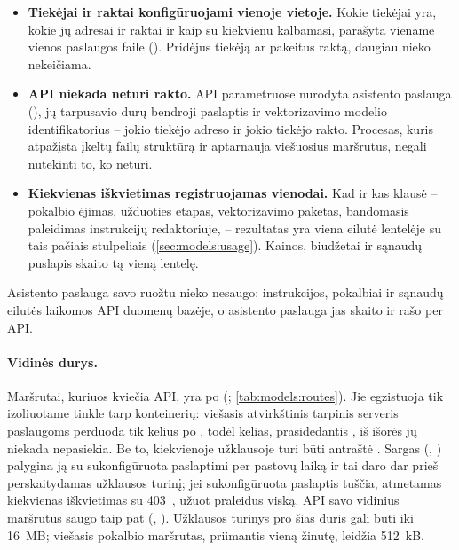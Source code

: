 \begin{itemize}
  \item \textbf{Tiekėjai ir raktai konfigūruojami vienoje vietoje.} Kokie tiekėjai yra, kokie
    jų adresai ir raktai ir kaip su kiekvienu kalbamasi, parašyta viename vienos paslaugos
    faile (). Pridėjus tiekėją ar pakeitus raktą, daugiau nieko
    nekeičiama.
  \item \textbf{API niekada neturi rakto.} API parametruose nurodyta asistento paslauga
    (), jų tarpusavio durų bendroji paslaptis ir vektorizavimo modelio
    identifikatorius -- jokio tiekėjo adreso ir jokio tiekėjo rakto. Procesas, kuris atpažįsta
    įkeltų failų struktūrą ir aptarnauja viešuosius maršrutus, negali nutekinti to, ko neturi.
  \item \textbf{Kiekvienas iškvietimas registruojamas vienodai.} Kad ir kas klausė -- pokalbio
    ėjimas, užduoties etapas, vektorizavimo paketas, bandomasis paleidimas instrukcijų
    redaktoriuje, -- rezultatas yra viena eilutė lentelėje  su tais pačiais
    stulpeliais (\cref{sec:models:usage}). Kainos, biudžetai ir sąnaudų puslapis skaito tą
    vieną lentelę.
\end{itemize}

Asistento paslauga savo ruožtu nieko nesaugo: instrukcijos, pokalbiai ir sąnaudų eilutės
laikomos API duomenų bazėje, o asistento paslauga jas skaito ir rašo per API.

\paragraph{Vidinės durys.} Maršrutai, kuriuos kviečia API, yra po 
(; \cref{tab:models:routes}). Jie egzistuoja tik izoliuotame tinkle
tarp konteinerių: viešasis atvirkštinis tarpinis serveris paslaugoms perduoda tik kelius po
, todėl kelias, prasidedantis , iš išorės jų niekada nepasiekia.
Be to, kiekvienoje užklausoje turi būti antraštė . Sargas
(, ) palygina ją su sukonfigūruota
paslaptimi per pastovų laiką ir tai daro dar prieš perskaitydamas užklausos turinį; jei
sukonfigūruota paslaptis tuščia, atmetamas kiekvienas iškvietimas su
403~, užuot praleidus viską. API savo vidinius maršrutus saugo taip pat
(, ). Užklausos turinys pro šias
duris gali būti iki 16~MB; viešasis pokalbio maršrutas, priimantis vieną žinutę, leidžia
512~kB.

